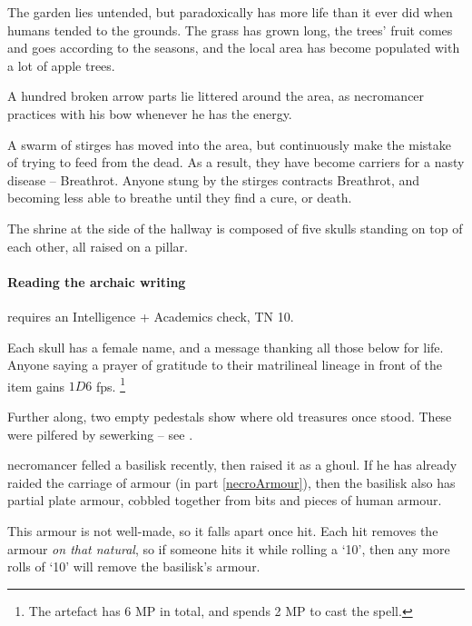 
The garden lies untended, but paradoxically has more life than it ever did when humans tended to the grounds.
The grass has grown long, the trees' fruit comes and goes according to the seasons, and the local area has become populated with a lot of apple trees.

A hundred broken arrow parts lie littered around the area, as \gls{necromancer} practices with his bow whenever he has the energy.


\stirgeSwarm

A swarm of stirges%
has moved into the area, but continuously make the mistake of trying to feed from the dead.
As a result, they have become carriers for a nasty disease -- Breathrot.%
Anyone stung by the stirges contracts Breathrot, and becoming less able to breathe until they find a cure, or death.


The shrine at the side of the hallway is composed of five skulls standing on top of each other, all raised on a pillar.

\paragraph{Reading the archaic writing}
requires an Intelligence + Academics check, TN 10.

Each skull has a female name, and a message thanking all those below for life.
Anyone saying a prayer of gratitude to their matrilineal lineage in front of the item gains $1D6$ \glspl{fp}.%
\footnote{The \gls{artefact} has 6 MP in total, and spends 2 MP to cast the spell.}

Further along, two empty pedestals show where old treasures once stood.
These were pilfered by \gls{sewerking} -- see .


\Gls{necromancer} felled a basilisk recently, then raised it as a ghoul.
If he has already raided the carriage of armour (in part \vref{necroArmour}), then the basilisk also has partial plate armour, cobbled together from bits and pieces of human armour.

This armour is not well-made, so it falls apart once hit.
Each hit removes the armour \textit{on that \gls{natural}}, so if someone hits it while rolling a `10', then any more rolls of `10' will remove the basilisk's armour.

